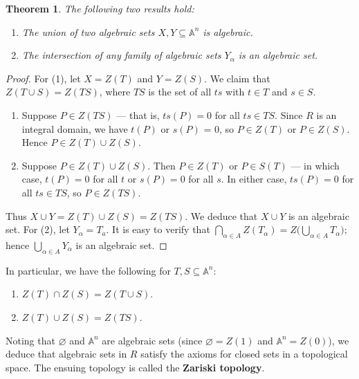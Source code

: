 \documentclass[11pt]{article}
\newtheorem{theorem}{Theorem}
\begin{document}
\begin{adjustwidth}{1cm}{}
  \begin{theorem}
    The following two results hold:
    \begin{enumerate}
      \item The union of two algebraic sets $X, Y \subseteq \mathbb{A}^{n}$ is algebraic.
      \item The intersection of any family of algebraic sets $Y_{\alpha}$ is an algebraic set.
    \end{enumerate}
  \end{theorem}
  \begin{proof}
    For (1), let $X = Z(T)$ and $Y = Z(S)$. We claim that $Z(T \cup S) = Z(TS)$, where $TS$ is the set of all $ts$ with $t \in T$ and $s \in S$.
    \begin{enumerate}
      \item Suppose $P \in Z(TS)$ --- that is, $ts(P) = 0$ for all $ts \in TS$. Since $R$ is an integral domain, we have $t(P)$ or $s(P)$ = 0, so $P \in Z(T)$ or $P \in Z(S)$. Hence $P \in Z(T) \cup Z(S)$.
      \item Suppose $P \in Z(T) \cup Z(S)$. Then $P \in Z(T)$ or $P \in S(T)$ --- in which case, $t(P) = 0$ for all $t$ or $s(P) = 0$ for all $s$. In either case, $ts(P) = 0$ for all $ts \in TS$, so $P \in Z(TS)$.
    \end{enumerate}
    Thus $X \cup Y = Z(T) \cup Z(S) = Z(TS)$. We deduce that $X \cup Y$ is an algebraic set. For (2), let $Y_{\alpha} = T_{a}$. It is easy to verify that $\bigcap_{\alpha \in A} Z(T_{\alpha}) = Z \big( \bigcup_{\alpha \in A} T_{\alpha} \big)$; hence $\bigcup_{\alpha \in A} Y_{\alpha}$ is an algebraic set.
  \end{proof}
\end{adjustwidth}

\newpage

In particular, we have the following for $T, S \subseteq \mathbb{A}^{n}$:
\begin{enumerate}
  \item $Z(T) \cap Z(S) = Z(T \cup S)$.
  \item $Z(T) \cup Z(S) = Z(TS)$.
\end{enumerate}

Noting that $\varnothing$ and $\mathbb{A}^{n}$ are algebraic sets (since $\varnothing = Z(1)$ and $\mathbb{A}^{n} = Z(0)$), we deduce that algebraic sets in $R$ satisfy the axioms for closed sets in a topological space. The ensuing topology is called the \textbf{Zariski topology}.
\end{document}
